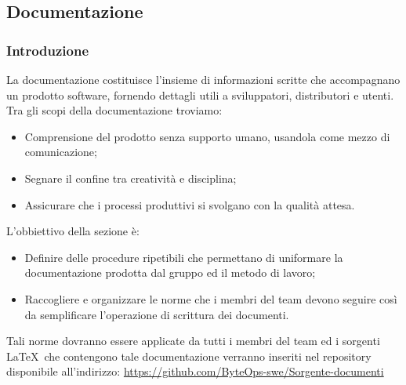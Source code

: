 \subsection{Documentazione}

\subsubsection{Introduzione}
La documentazione costituisce l'insieme di informazioni scritte che accompagnano un prodotto software, fornendo dettagli utili a sviluppatori, distributori e utenti.\\
Tra gli scopi della documentazione troviamo:
\begin{itemize}
    \item Comprensione del prodotto senza supporto umano, usandola come mezzo di comunicazione;
    \item Segnare il confine tra creatività e disciplina;
    \item Assicurare che i processi produttivi si svolgano con la qualità attesa.
\end{itemize}
L'obbiettivo della sezione è:
\begin{itemize}
    \item  Definire delle procedure ripetibili che permettano di uniformare la documentazione prodotta dal gruppo ed il metodo di lavoro;
    \item  Raccogliere e organizzare le norme che i membri del team devono seguire così da semplificare l'operazione di scrittura dei documenti.
\end{itemize}
Tali norme dovranno essere applicate da tutti i membri del team ed i sorgenti \LaTeX\ che contengono tale documentazione verranno inseriti nel repository disponibile all'indirizzo:
\href{https://github.com/ByteOps-swe/Sorgente-documenti}{https://github.com/ByteOps-swe/Sorgente-documenti}

\begin{comment} \paragraph*{Primi approcci alla redazione di documenti e problematiche riscontrate}
Per la composizione iniziale dei documenti richiesti per la candidatura, è stato sperimentato un'approccio che impiegava gli strumenti di Google Drive. Tale metodologia consentiva ai redattori di redigere agevolmente i documenti senza la necessità di padroneggiare la sintassi LaTeX, con l'intenzione di trasporre successivamente il contenuto in LaTeX una volta che fosse stato validato dai verificatori. Tuttavia, questo approccio ha suscitato problematiche, tra cui:
\begin{itemize}
    \item Rischio di incoerenza tra il contenuto presente negli strumenti di Google Drive.
    \item Prolungato impiego di tempo per la riscrittura in LaTeX, dovuto alla necessità di un passaggio aggiuntivo.
\end{itemize}
Per tali ragioni si è presa la decisione di adottare un nuovo approccio.
\end{comment}
